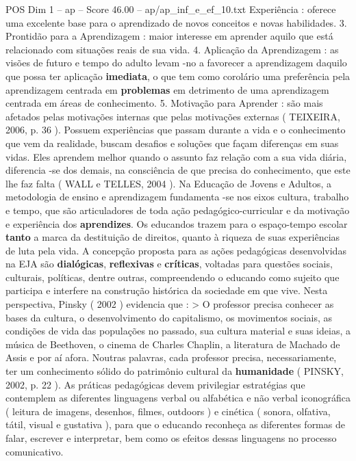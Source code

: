 \begin{textsample}{POS Dim 1 – ap – Score 46.00 – ap/ap\_inf\_e\_ef\_10.txt}
Experiência : oferece uma excelente base para o aprendizado de novos conceitos e novas habilidades. 3.
Prontidão para a Aprendizagem : maior interesse em aprender aquilo que está relacionado com situações reais de sua vida. 4.
Aplicação da Aprendizagem : as visões de futuro e tempo do adulto levam -no a favorecer a aprendizagem daquilo que possa ter aplicação \textbf{imediata}, o que tem como corolário uma preferência pela aprendizagem centrada em \textbf{problemas} em detrimento de uma aprendizagem centrada em áreas de conhecimento. 5.
Motivação para Aprender : são mais afetados pelas motivações internas que pelas motivações externas ( TEIXEIRA, 2006, p. 36 ).
Possuem experiências que passam durante a vida e o conhecimento que vem da realidade, buscam desafios e soluções que façam diferenças em suas vidas.
Eles aprendem melhor quando o assunto faz relação com a sua vida diária, diferencia -se dos demais, na consciência de que precisa do conhecimento, que este lhe faz falta ( WALL e TELLES, 2004 ).
Na Educação de Jovens e Adultos, a metodologia de ensino e aprendizagem fundamenta -se nos eixos cultura, trabalho e tempo, que são articuladores de toda ação pedagógico-curricular e da motivação e experiência dos \textbf{aprendizes}.
Os educandos trazem para o espaço-tempo escolar \textbf{tanto} a marca da destituição de direitos, quanto à riqueza de suas experiências de luta pela vida.
A concepção proposta para as ações pedagógicas desenvolvidas na EJA são \textbf{dialógicas}, \textbf{reflexivas} e \textbf{críticas}, voltadas para questões sociais, culturais, políticas, dentre outras, compreendendo o educando como sujeito que participa e interfere na construção histórica da sociedade em que vive.
Nesta perspectiva, Pinsky ( 2002 ) evidencia que : > O professor precisa conhecer as bases da cultura, o desenvolvimento do capitalismo, os movimentos sociais, as condições de vida das populações no passado, sua cultura material e suas ideias, a música de Beethoven, o cinema de Charles Chaplin, a literatura de Machado de Assis e por aí afora.
Noutras palavras, cada professor precisa, necessariamente, ter um conhecimento sólido do patrimônio cultural da \textbf{humanidade} ( PINSKY, 2002, p. 22 ).
As práticas pedagógicas devem privilegiar estratégias que contemplem as diferentes linguagens verbal ou alfabética e não verbal iconográfica ( leitura de imagens, desenhos, filmes, outdoors ) e cinética ( sonora, olfativa, tátil, visual e gustativa ), para que o educando reconheça as diferentes formas de falar, escrever e interpretar, bem como os efeitos dessas linguagens no processo comunicativo.

\end{textsample}
